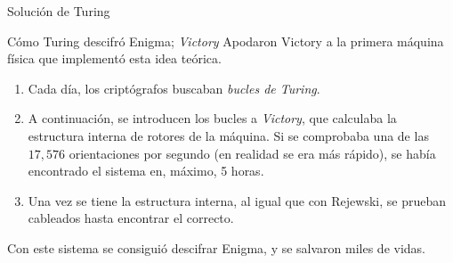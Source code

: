 \documentclass[aspectratio=169]{beamer}
\begin{document}
\begin{frame}{Solución de Turing}
	\begin{block}{Cómo Turing descifró Enigma; \textit{Victory}}
		Apodaron Victory a la primera máquina física que implementó esta idea teórica.
		\begin{enumerate}
			\item Cada día, los criptógrafos buscaban \textit{bucles de Turing}. \pause
			\item A continuación, se introducen los bucles a \textit{Victory}, que calculaba la estructura interna de rotores de la máquina. Si se comprobaba una de las $17,576$ orientaciones por segundo (en realidad se era más rápido), se había encontrado el sistema en, máximo, 5 horas. \pause
			\item Una vez se tiene la estructura interna, al igual que con Rejewski, se prueban cableados hasta encontrar el correcto. \pause
		\end{enumerate}
	\end{block} \pause
	Con este sistema se consiguió descifrar Enigma, y se salvaron miles de vidas.
\end{frame}
\end{document}
